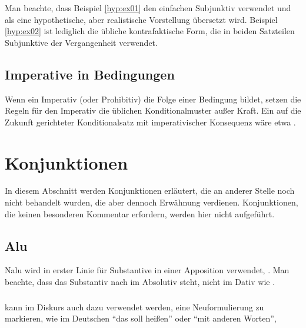 \noindent Man beachte, dass Beispiel \ref{hyp:ex01} den einfachen Subjunktiv verwendet und als eine hypothetische, aber realistische Vorstellung übersetzt wird. Beispiel \ref{hyp:ex02} ist lediglich die übliche kontrafaktische Form, die in beiden Satzteilen Subjunktive der Vergangenheit verwendet.

\subsection{Imperative in Bedingungen} Wenn ein Imperativ (oder Prohibitiv) die Folge einer Bedingung bildet, setzen die Regeln für den Imperativ die üblichen Konditionalmuster außer Kraft. Ein auf die Zukunft gerichteter Konditionalsatz mit imperativischer Konsequenz wäre etwa  . 

\section{Konjunktionen}
\noindent In diesem Abschnitt werden Konjunktionen erläutert, die an anderer Stelle noch nicht behandelt wurden, die aber dennoch Erwähnung verdienen. Konjunktionen, die keinen besonderen Kommentar erfordern, werden hier nicht aufgeführt.

\subsection{Alu} N{alu} wird in erster Linie für Substantive in einer Apposition verwendet,  . Man beachte, dass das Substantiv nach  im Absolutiv steht, nicht im Dativ wie .
\label{syn:conj:alu}

\subsubsection{}  kann im Diskurs auch dazu verwendet werden, eine Neuformulierung zu markieren, wie im Deutschen ``das soll heißen'' oder ``mit anderen Worten'',  

